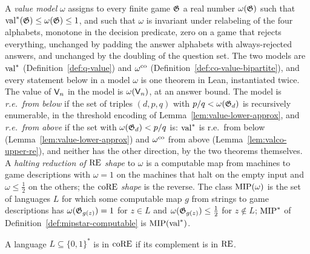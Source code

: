 \begin{definition}
\label{def:value-model}
\leanok
A \emph{value model} $\omega$ assigns to every finite game $\mathfrak{G}$ a real number
$\omega(\mathfrak{G})$ such that $\mathrm{val}^*(\mathfrak{G}) \leq \omega(\mathfrak{G}) \leq 1$, and such that
$\omega$ is invariant under relabeling of the four alphabets, monotone in the decision
predicate, zero on a game that rejects everything, unchanged by padding the answer alphabets
with always-rejected answers, and unchanged by the doubling of the question set. The two
models are $\mathrm{val}^*$ (Definition~\ref{def:q-value}) and $\omega^{\mathrm{co}}$
(Definition~\ref{def:co-value-bipartite}), and every statement below in a model $\omega$ is
one theorem in Lean, instantiated twice. The value of $\mathsf{V}_n$ in the model is
$\omega(\mathsf{V}_n)$, at an answer bound. The model is \emph{r.e.\ from below} if the set of
triples $(d, p, q)$ with $p/q < \omega(\mathfrak{G}_d)$ is recursively enumerable, in the threshold
encoding of Lemma~\ref{lem:value-lower-approx}, and \emph{r.e.\ from above} if the set with
$\omega(\mathfrak{G}_d) < p/q$ is: $\mathrm{val}^*$ is r.e.\ from below (Lemma~\ref{lem:value-lower-approx})
and $\omega^{\mathrm{co}}$ from above (Lemma~\ref{lem:valco-upper-re}), and neither has the other
direction, by the two theorems themselves. A \emph{halting reduction of $\mathrm{RE}$ shape} to
$\omega$ is a computable map from machines to game descriptions with $\omega = 1$ on the
machines that halt on the empty input and $\omega \leq \frac12$ on the others; the
\emph{$\mathrm{coRE}$ shape} is the reverse. The class $\mathrm{MIP}(\omega)$ is the set of languages
$L$ for which some computable map $g$ from strings to game descriptions has
$\omega(\mathfrak{G}_{g(z)}) = 1$ for $z \in L$ and $\omega(\mathfrak{G}_{g(z)}) \leq \frac12$ for
$z \notin L$; $\mathrm{MIP}^*$ of Definition~\ref{def:mipstar-computable} is
$\mathrm{MIP}(\mathrm{val}^*)$.
\end{definition}

\begin{definition}
\label{def:core}
\leanok
A language $L \subseteq \{0,1\}^*$ is in $\mathrm{coRE}$ if its complement is in $\mathrm{RE}$.
\end{definition}

